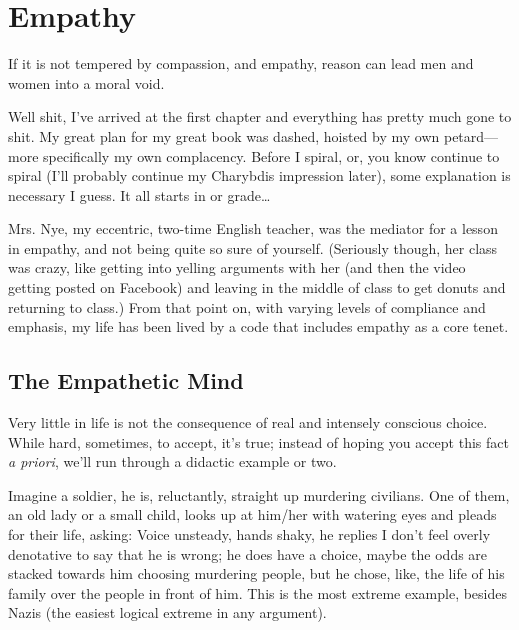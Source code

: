 \documentclass[../butidigress.tex]{subfiles}
\begin{document}
\chapter{Empathy}\label{chap:empathy}
\epigraph{If it is not tempered by compassion, and empathy, reason can lead men and women into a moral void.}{}
\newpage

Well shit, I've arrived at the first chapter and everything has pretty much gone to shit.
My great plan for my great book was dashed, hoisted by my own petard---more specifically my own complacency.
Before I spiral, or, you know continue to spiral (I'll probably continue my Charybdis impression later), some explanation is necessary I guess.
It all starts in  or  grade\ldots{}

Mrs. Nye, my eccentric, two-time English teacher, was the mediator for a lesson in empathy, and not being quite so sure of yourself.
(Seriously though, her class was crazy, like getting into yelling arguments with her (and then the video getting posted on Facebook) and leaving in the middle of class to get donuts and returning to class.)
From that point on, with varying levels of compliance and emphasis, my life has been lived by a code that includes empathy as a core tenet.

\section{The Empathetic Mind}
Very little in life is not the consequence of real and intensely conscious choice.
While hard, sometimes, to accept, it's true; instead of hoping you accept this fact \textit{a priori}, we'll run through a didactic example or two.

Imagine a soldier, he is, reluctantly, straight up murdering civilians.
One of them, an old lady or a small child, looks up at him/her with watering eyes and pleads for their life, asking: 
Voice unsteady, hands shaky, he replies 
I don't feel overly denotative to say that he is wrong; he does have a choice, maybe the odds are stacked towards him choosing murdering people, but he chose, like, the life of his family over the people in front of him.
This is the most extreme example, besides Nazis (the easiest logical extreme in any argument).
\end{document}
